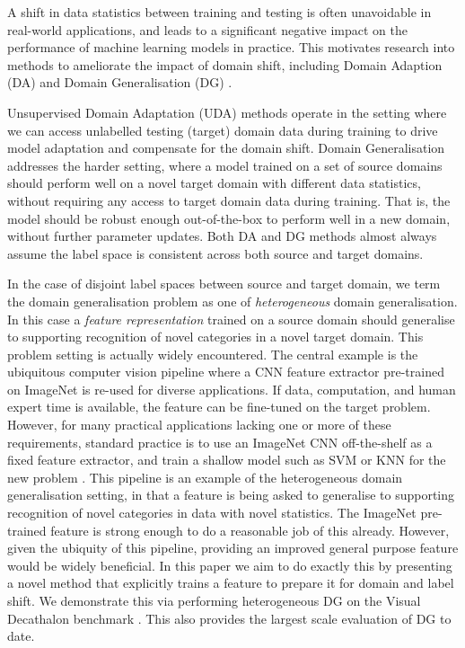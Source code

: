 \documentclass{article}
\begin{document}
A shift in data statistics between training and testing is often unavoidable in real-world applications, and leads to a significant negative impact on the performance of machine learning models in practice. This motivates research into methods to ameliorate the impact of domain shift, including  Domain Adaption (DA) \cite{Bousmalis16, Ganin15, Long15, Long16} and Domain Generalisation (DG) \cite{Muandet13, Ghifary15, Li18, Shankar18}.

Unsupervised Domain Adaptation (UDA) \cite{Long16, Saito17tri, Shu18dirt} methods operate in the setting where we can access unlabelled testing (target) domain data during training to drive model adaptation and compensate for the domain shift. Domain Generalisation addresses the harder setting, where a model trained on a set of source domains should perform well on a novel target domain with different data statistics, without requiring any access to target domain data during training. That is, the model should be robust enough  out-of-the-box to perform well in a new domain, without further parameter updates. Both DA and DG methods almost always assume the label space is consistent across both source and target domains.

In the case of disjoint label spaces between source and target domain, we term the domain generalisation problem as one of \emph{heterogeneous} domain generalisation. In this case a \emph{feature representation} trained on a source domain should generalise to supporting recognition of novel categories in a novel target domain. This problem setting is actually widely encountered. The central example is the ubiquitous computer vision pipeline where a CNN feature extractor pre-trained on ImageNet is re-used for diverse applications. If data, computation, and human expert time is available, the feature can be fine-tuned on the target problem. However, for many practical applications lacking one or more of these requirements, standard practice is to use an ImageNet CNN off-the-shelf as a  fixed feature extractor, and  train a shallow model such as SVM or KNN for the new problem  \cite{donahue2014decaf,razavian2014cnnAstound}. This pipeline is an example of the heterogeneous domain generalisation setting, in that a feature is being asked to generalise to supporting recognition of novel categories in data with novel statistics. The ImageNet pre-trained feature is strong enough to do a reasonable job of this already. However, given the ubiquity of this pipeline, providing an improved general purpose feature would be widely beneficial. In this paper we aim to do exactly this by presenting a novel method that explicitly  trains a feature to prepare it for domain and label shift. We demonstrate this via performing heterogeneous DG on the Visual Decathalon benchmark \cite{Rebuffi17}. This also provides the largest scale evaluation of DG to date.
\end{document}
